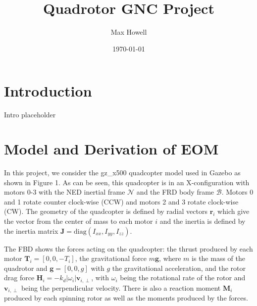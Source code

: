 \documentclass[11pt]{article}
\title{Quadrotor GNC Project}
\author{Max Howell}
\date{\today}
\newcommand{\mb}[1]{\mathbf{#1}}
\begin{document}
\maketitle

\section{Introduction}

Intro placeholder


\section{Model and Derivation of EOM}

In this project, we consider the gz\_x500 quadcopter model used in Gazebo as shown in Figure 1. %
As can be seen, this quadcopter is in an X-configuration with motors 0-3 with the NED inertial frame $\mathcal{N}$ and the FRD body frame $\mathcal{B}$.
Motors 0 and 1 rotate counter clock-wise (CCW) and motors 2 and 3 rotate clock-wise (CW).
The geometry of the quadcopter is defined by radial vectors $\mb{r}_i$ which give the vector from the center of mass to each motor $i$ and the inertia is defined by the inertia matrix $\mb{J} = \mathrm{diag}(I_{xx}, I_{yy}, I_{zz})$.

The FBD shows the forces acting on the quadcopter: the thrust produced by each motor $\mb{T}_i = [0, 0, -T_i]$, the gravitational force $m\mb{g}$, where $m$ is the mass of the quadrotor and $\mb{g} = [0, 0, g]$ with $g$ the gravitational acceleration, and the rotor drag force $\mb{H}_i = -k_d |\omega_i| \mb{v}_{i,\perp}$, with $\omega_i$ being the rotational rate of the rotor and $\mb{v}_{i,\perp}$ being the perpendicular velocity.
There is also a reaction moment $\mb{M}_i$ produced by each spinning rotor as well as the moments produced by the forces.
\end{document}
